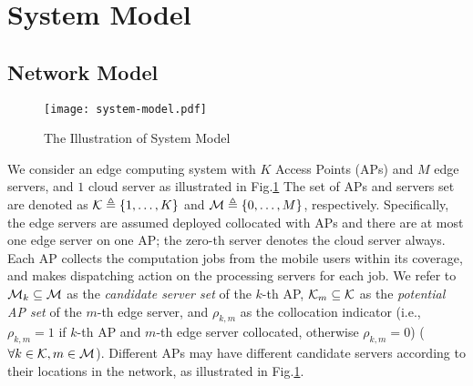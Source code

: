 \section{System Model}
\label{sec:model}
\subsection{Network Model}
\begin{figure}[htp!]
    \centering
    \texttt{[image: system-model.pdf]}
    \caption{The Illustration of System Model}
    \label{fig:system}
\end{figure}

We consider an edge computing system with $K$ Access Points (APs) and $M$ edge servers, and $1$ cloud server as illustrated in Fig.\ref{fig:system}
The set of APs and servers set are denoted as $\mathcal{K} \triangleq \{1,\dots,K\}$ and $\mathcal{M} \triangleq \{0,\dots,M\}$, respectively.
Specifically, the edge servers are assumed deployed collocated with APs and there are at most one edge server on one AP; the zero-th server denotes the cloud server always.
Each AP collects the computation jobs from the mobile users within its coverage, and makes dispatching action on the processing servers for each job.
%
We refer to $\mathcal{M}_{k} \subseteq \mathcal{M}$ as the \emph{candidate server set} of the $k$-th AP,  $\mathcal{K}_{m} \subseteq \mathcal{K}$ as the \emph{potential AP set} of the $m$-th edge server, and $\rho_{k,m}$ as the collocation indicator (i.e., $\rho_{k,m}=1$ if $k$-th AP and $m$-th edge server collocated, otherwise $\rho_{k,m}=0$) ($\forall k\in\mathcal{K}, m\in\mathcal{M}$).
Different APs may have different candidate servers according to their locations in the network, as illustrated in Fig.\ref{fig:system}.
%


